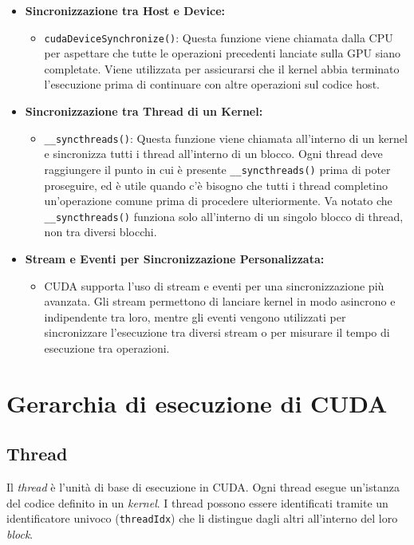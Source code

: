 \documentclass[12pt,a4paper]{report}
\begin{document}
\begin{itemize}
    \item \textbf{Sincronizzazione tra Host e Device:}
    \begin{itemize}
        \item \texttt{cudaDeviceSynchronize()}: Questa funzione viene chiamata dalla CPU per aspettare che tutte le operazioni precedenti lanciate sulla GPU siano completate. Viene utilizzata per assicurarsi che il kernel abbia terminato l'esecuzione prima di continuare con altre operazioni sul codice host.
    \end{itemize}
    
    \item \textbf{Sincronizzazione tra Thread di un Kernel:}
    \begin{itemize}
        \item \texttt{\_\_syncthreads()}: Questa funzione viene chiamata all'interno di un kernel e sincronizza tutti i thread all'interno di un blocco. Ogni thread deve raggiungere il punto in cui è presente \texttt{\_\_syncthreads()} prima di poter proseguire, ed è utile quando c'è bisogno che tutti i thread completino un’operazione comune prima di procedere ulteriormente. Va notato che \texttt{\_\_syncthreads()} funziona solo all'interno di un singolo blocco di thread, non tra diversi blocchi.
    \end{itemize}
    
    \item \textbf{Stream e Eventi per Sincronizzazione Personalizzata:}
    \begin{itemize}
        \item CUDA supporta l'uso di stream e eventi per una sincronizzazione più avanzata. Gli stream permettono di lanciare kernel in modo asincrono e indipendente tra loro, mentre gli eventi vengono utilizzati per sincronizzare l'esecuzione tra diversi stream o per misurare il tempo di esecuzione tra operazioni.
    \end{itemize}
\end{itemize}

\section{Gerarchia di esecuzione di CUDA}



\subsection*{Thread}
Il \textit{thread} è l'unità di base di esecuzione in CUDA. Ogni thread esegue un'istanza del codice definito in un \textit{kernel}. I thread possono essere identificati tramite un identificatore univoco (\texttt{threadIdx}) che li distingue dagli altri all'interno del loro \textit{block}.
\end{document}

